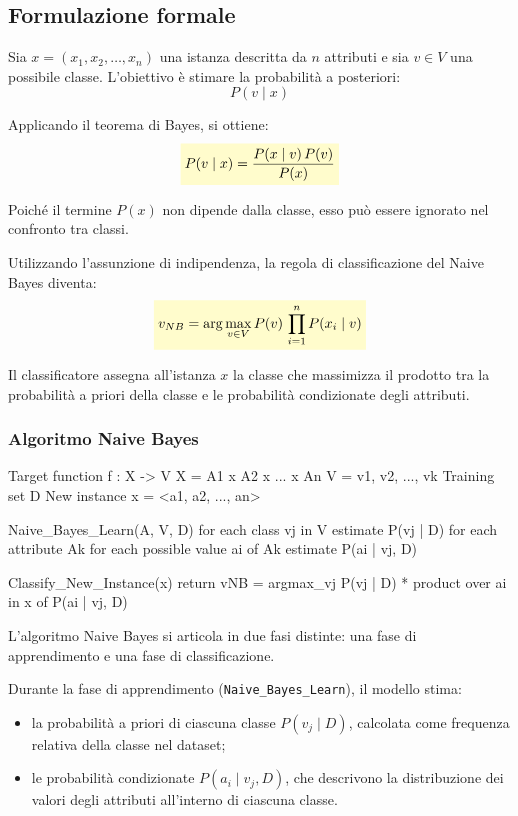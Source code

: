 \documentclass[a4paper,12pt]{report}
\newcommand{\highlight}[1]{%
\colorbox{yellow!20}{$\displaystyle #1$}%
}
\begin{document}
\subsection{Formulazione formale}

Sia \( x = (x_1, x_2, \dots, x_n) \) una istanza descritta da \( n \) attributi e sia \( v \in V \) una possibile classe.
L’obiettivo è stimare la probabilità a posteriori:
\[
P(v \mid x)
\]

Applicando il teorema di Bayes, si ottiene:
\[
\highlight{
P(v \mid x) = \frac{P(x \mid v)\, P(v)}{P(x)}}
\]

Poiché il termine \( P(x) \) non dipende dalla classe, esso può essere ignorato nel confronto tra classi.

Utilizzando l’assunzione di indipendenza, la regola di classificazione del Naive Bayes diventa:
\[
\highlight{
v_{NB} = \arg\max_{v \in V} P(v)\, \prod_{i=1}^{n} P(x_i \mid v)}
\]

Il classificatore assegna all’istanza \( x \) la classe che massimizza il prodotto tra la probabilità a priori della classe e le probabilità condizionate degli attributi.

\subsubsection{Algoritmo Naive Bayes}

\begin{pseudocode}
Target function f : X -> V
X = A1 x A2 x ... x An
V = {v1, v2, ..., vk}
Training set D
New instance x = <a1, a2, ..., an>

Naive_Bayes_Learn(A, V, D)
    for each class vj in V
        estimate P(vj | D)
        for each attribute Ak
            for each possible value ai of Ak
                estimate P(ai | vj, D)

Classify_New_Instance(x)
    return vNB = argmax_vj P(vj | D) *
                 product over ai in x of P(ai | vj, D)
\end{pseudocode}

L’algoritmo Naive Bayes si articola in due fasi distinte: una fase di apprendimento e una fase di classificazione.

Durante la fase di apprendimento (\texttt{Naive\_Bayes\_Learn}), il modello stima:
\begin{itemize}
    \item la probabilità a priori di ciascuna classe \( P(v_j \mid D) \), calcolata come frequenza relativa della classe nel dataset;
    \item le probabilità condizionate \( P(a_i \mid v_j, D) \), che descrivono la distribuzione dei valori degli attributi all’interno di ciascuna classe.
\end{itemize}
\end{document}
